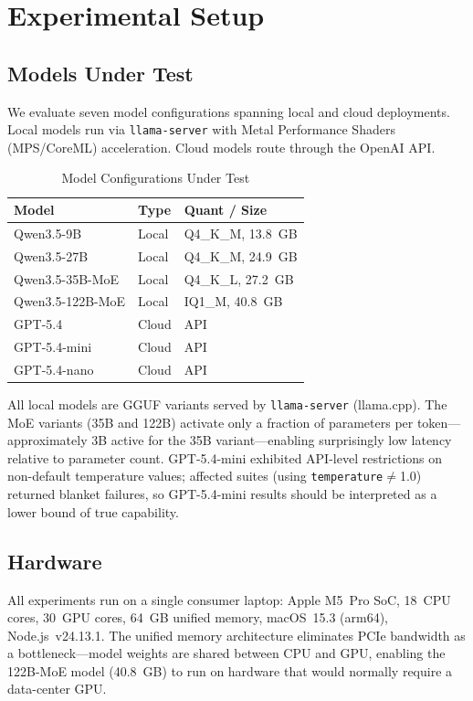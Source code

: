 \documentclass[onecolumn,10pt]{IEEEtran}
\begin{document}
\section{Experimental Setup}

\subsection{Models Under Test}

We evaluate seven model configurations spanning local and cloud
deployments. Local models run via \texttt{llama-server} with Metal
Performance Shaders (MPS/CoreML) acceleration. Cloud models route
through the OpenAI API.

\begin{table}[h]
\centering
\caption{Model Configurations Under Test}
\label{tab:models}
\small
\begin{tabular}{p{2.8cm}p{1.3cm}p{1.7cm}}
\toprule
\textbf{Model} & \textbf{Type} & \textbf{Quant / Size} \\
\midrule
Qwen3.5-9B & Local & Q4\_K\_M, 13.8~GB \\
Qwen3.5-27B & Local & Q4\_K\_M, 24.9~GB \\
Qwen3.5-35B-MoE & Local & Q4\_K\_L, 27.2~GB \\
Qwen3.5-122B-MoE & Local & IQ1\_M, 40.8~GB \\
GPT-5.4 & Cloud & API \\
GPT-5.4-mini & Cloud & API \\
GPT-5.4-nano & Cloud & API \\
\bottomrule
\end{tabular}
\end{table}

All local models are GGUF variants served by \texttt{llama-server}
(llama.cpp). The MoE variants (35B and 122B) activate only a fraction
of parameters per token---approximately 3B active for the 35B
variant---enabling surprisingly low latency relative to parameter count.
GPT-5.4-mini exhibited API-level restrictions on non-default temperature
values; affected suites (using \texttt{temperature}$\neq$1.0) returned
blanket failures, so GPT-5.4-mini results should be interpreted as a
lower bound of true capability.

\subsection{Hardware}

All experiments run on a single consumer laptop:
Apple M5~Pro SoC, 18~CPU cores, 30~GPU cores, 64~GB unified memory,
macOS~15.3 (arm64), Node.js~v24.13.1. The unified memory architecture
eliminates PCIe bandwidth as a bottleneck---model weights are shared
between CPU and GPU, enabling the 122B-MoE model (40.8~GB) to run on
hardware that would normally require a data-center GPU.
\end{document}
